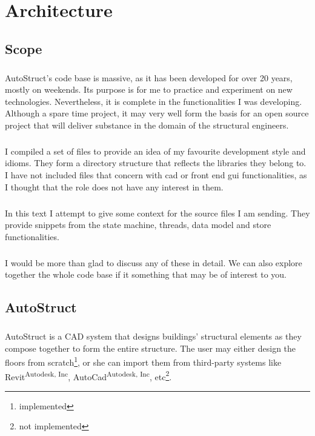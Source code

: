 \chapter{Architecture}
\section{Scope}
\paragraph{}
AutoStruct's code base is massive, as it has been developed for over 20 years, mostly on weekends. Its purpose is for me to practice and experiment on new technologies. Nevertheless, it is complete in the functionalities I was developing. Although a spare time project, it may very well form the basis for an open source project that will deliver substance in the domain of the structural engineers.
\paragraph{}
I compiled a set of files to provide an idea of my favourite development style and idioms. They form a directory structure that reflects the libraries they belong to. I have not included files that concern with cad or front end gui functionalities, as I thought that the role does not have any interest in them.
\paragraph{}
In this text I attempt to give some context for the source files I am sending. They provide snippets from the state machine, threads, data model and store functionalities.
\paragraph{}
I would be more than glad to discuss any of these in detail. We can also explore together the whole code base if it something that may be of interest to you.
\section{AutoStruct}
\paragraph{}
AutoStruct is a CAD system that designs buildings' structural elements as they compose together to form the entire structure. The user may either design the floors from scratch\footnote{implemented}, or she can import them from third-party systems like Revit\textsuperscript{Autodesk, Inc}, AutoCad\textsuperscript{Autodesk, Inc}, etc\footnote{not implemented}. 
